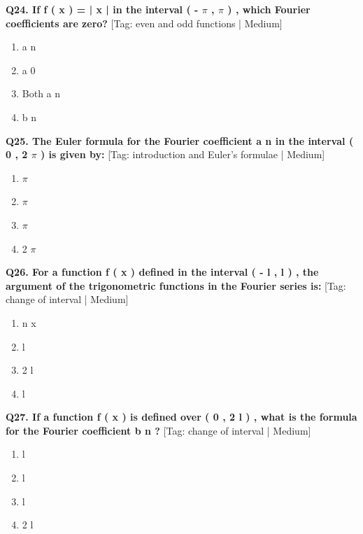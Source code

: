 \noindent\textbf{Q24. If f ( x ) = | x | in the interval ( - $\pi$ , $\pi$ ) , which Fourier coefficients are zero?} \hfill [Tag: even and odd functions | Medium]
\begin{enumerate}[label=(\alph*),topsep=2pt,itemsep=1pt,partopsep=0pt,parsep=0pt]
    \item {{a n}}
    \item {{a 0}}
    \item {{Both a n}}
    \item {{b n}}
\end{enumerate}
\vspace{2mm}

\noindent\textbf{Q25. The Euler formula for the Fourier coefficient a n in the interval ( 0 , 2 $\pi$ ) is given by:} \hfill [Tag: introduction and Euler's formulae | Medium]
\begin{enumerate}[label=(\alph*),topsep=2pt,itemsep=1pt,partopsep=0pt,parsep=0pt]
    \item {{$\pi$}}
    \item {{$\pi$}}
    \item {{$\pi$}}
    \item {{2 $\pi$}}
\end{enumerate}
\vspace{2mm}

\noindent\textbf{Q26. For a function f ( x ) defined in the interval ( - l , l ) , the argument of the trigonometric functions in the Fourier series is:} \hfill [Tag: change of interval | Medium]
\begin{enumerate}[label=(\alph*),topsep=2pt,itemsep=1pt,partopsep=0pt,parsep=0pt]
    \item {{n x}}
    \item {{l}}
    \item {{2 l}}
    \item {{l}}
\end{enumerate}
\vspace{2mm}

\noindent\textbf{Q27. If a function f ( x ) is defined over ( 0 , 2 l ) , what is the formula for the Fourier coefficient b n ?} \hfill [Tag: change of interval | Medium]
\begin{enumerate}[label=(\alph*),topsep=2pt,itemsep=1pt,partopsep=0pt,parsep=0pt]
    \item {{l}}
    \item {{l}}
    \item {{l}}
    \item {{2 l}}
\end{enumerate}
\vspace{2mm}

